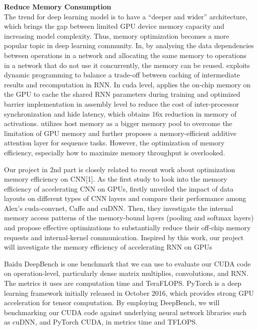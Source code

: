 \documentclass{article}
\begin{document}
\textbf{Reduce Memory Consumption} \\
 The trend for deep learning model is to have a “deeper and wider” architecture, which brings the gap between limited GPU device memory capacity and increasing model complexity. Thus, memory optimization becomes a more popular topic in deep learning community. In\cite{chen2015mxnet}, by analysing the data dependencies between operations in a network and allocating the same memory to operations in a network that do not use it concurrently, the memory can be reused.  \cite{gruslys2016memory} exploits dynamic programming to balance a trade-off between caching of intermediate results and recomputation in RNN. In cuda level, \cite{diamos2016persistent} applies the on-chip memory on the GPU to cache the shared RNN parameters during training and optimized barrier implementation in assembly level to reduce the cost of inter-processor synchronization and hide latency, which obtains 16x reduction in memory of activations. \cite{mengtraining} utilizes host memory as a bigger memory pool to overcome the limitation of GPU memory and further proposes a memory-efficient additive attention layer\cite{bahdanau2014neural} for sequence tasks. However, the optimization of memory efficiency, especially how to maximize memory throughput is overlooked. 

 Our project in 2nd part is closely related to recent work about optimization memory efficiency on CNN[1]. As the first study to look into the memory efficiency of accelerating CNN on GPUs, \cite{li2016optimizing} firstly unveiled the impact of data layouts on different types of CNN layers and compare their performance among Alex’s cuda-convnet, Caffe and cuDNN. Then, they investigate the internal memory access patterns of the memory-bound layers (pooling and softmax layers) and propose effective optimizations to substantially reduce their off-chip memory requests and internal-kernel communication. Inspired by this work, our project will investigate the memory efficiency of accelerating RNN on GPUs




Baidu DeepBench\cite{DeepBench} is one benchmark that we can use to evaluate our CUDA code on operation-level, particularly dense matrix multiplies, convolutions, and RNN. The metrics it uses are computation time and TeraFLOPS. 
PyTorch\cite{PyTorch} is a deep learning framework initially released in October 2016, which provides strong GPU acceleration for tensor computation. 
By employing DeepBench, we will benchmarking our CUDA code against underlying neural network libraries such as cuDNN, and PyTorch CUDA, in metrics time and TFLOPS.
\end{document}

